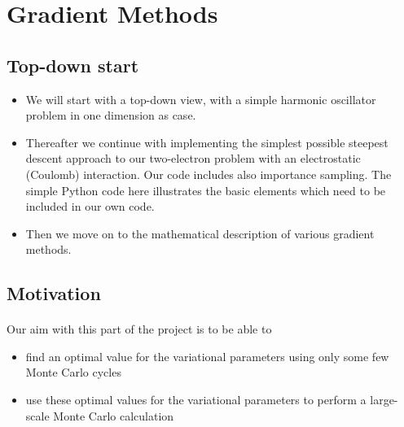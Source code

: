 \documentclass[%
oneside,                 %
final,                   %
10pt]{article}
\begin{document}

\newcommand{\exercisesection}[1]{\subsection*{#1}}



\section*{Gradient Methods}

\subsection*{Top-down start}

\begin{itemize}
\item We will start with a top-down view, with a simple harmonic oscillator problem in one dimension as case.

\item Thereafter we continue with implementing the simplest possible steepest descent approach to our two-electron problem with an electrostatic (Coulomb) interaction. Our code includes also importance sampling. The simple Python code here illustrates the basic elements which need to be included in our own code.

\item Then we move on to the mathematical description of various gradient methods.
\end{itemize}

\noindent
\subsection*{Motivation}

\paragraph{}
Our aim with this part of the project is to be able to
\begin{itemize}
\item find an optimal value for the variational parameters using only some few Monte Carlo cycles

\item use these optimal values for the variational parameters to perform a large-scale Monte Carlo calculation
\end{itemize}
\end{document}
